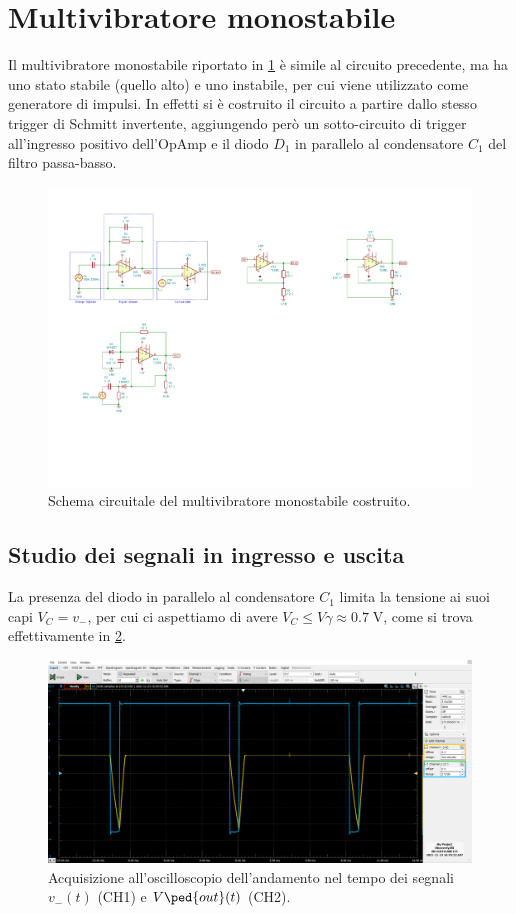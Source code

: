 \documentclass[10pt, a4paper, italian]{article}
\begin{document}
\section{Multivibratore monostabile}
Il multivibratore monostabile riportato in \cref{fig: mstableschm} è simile
al circuito precedente, ma ha uno stato stabile (quello alto) e uno instabile,
per cui viene utilizzato come generatore di impulsi. In effetti si è costruito
il circuito a partire dallo stesso trigger di Schmitt invertente, aggiungendo
però un sotto-circuito di trigger all'ingresso positivo dell'OpAmp e il diodo
$D_1$ in parallelo al condensatore $C_1$ del filtro passa-basso.
\begin{figure}[htbp]
    \centering
	\includegraphics[scale=1.2]{monostable}
    \caption{Schema circuitale del multivibratore monostabile costruito.
    \label{fig: mstableschm}}
\end{figure}

\subsection{Studio dei segnali in ingresso e uscita}
La presenza del diodo in parallelo al condensatore $C_1$ limita la tensione
ai suoi capi $V_C = v_-$, per cui ci aspettiamo di avere
$V_C \leq V\gamma \approx 0.7 \; \si{\V}$, come si trova effettivamente in
\cref{fig: mstabilev-}.
\begin{figure}[htbp]
\centering
\includegraphics[scale=0.42]{monostabileV-}
\caption{Acquisizione all'oscilloscopio dell'andamento nel tempo dei
segnali $v_- (t)$ (CH1) e $V\ped{out} (t)$ (CH2). \label{fig: mstabilev-}}
\end{figure}
\end{document}
